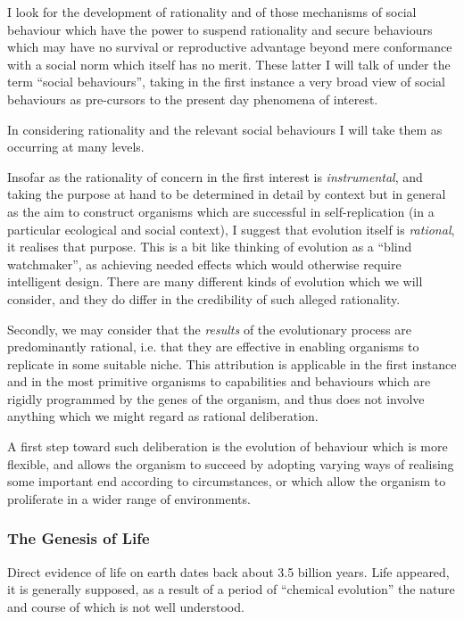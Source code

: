 \documentclass[10pt,titlepage]{book}
\begin{document}
I look for the development of rationality and of those mechanisms of social behaviour which have the power to suspend rationality and secure behaviours which may have no survival or reproductive advantage beyond mere conformance with a social norm which itself has no merit.
These latter I will talk of under the term ``social behaviours'', taking in the first instance a very broad view of social behaviours as pre-cursors to the present day phenomena of interest.

In considering rationality and the relevant social behaviours I will take them as occurring at many levels.

Insofar as the rationality of concern in the first interest is \emph{instrumental}, and taking the purpose at hand to be determined in detail by context but in general as the aim to construct organisms which are successful in self-replication (in a particular ecological and social context), I suggest that evolution itself is \emph{rational}, it realises that purpose.
This is a bit like thinking of evolution as a ``blind watchmaker'', as achieving needed effects which would otherwise require intelligent design.
There are many different kinds of evolution which we will consider, and they do differ in the credibility of such alleged rationality.

Secondly, we may consider that the \emph{results} of the evolutionary process are predominantly rational, i.e. that they are effective in enabling organisms to replicate in some suitable niche.
This attribution is applicable in the first instance and in the most primitive organisms to capabilities and behaviours which are rigidly programmed by the genes of the organism, and thus does not involve anything which we might regard as rational deliberation.

A first step toward such deliberation is the evolution of behaviour which is more flexible, and allows the organism to succeed by adopting varying ways of realising some important end according to circumstances, or which allow the organism to proliferate in a wider range of environments.

\subsubsection{The Genesis of Life}

Direct evidence of life on earth dates back about 3.5 billion years.
Life appeared, it is generally supposed, as a result of a period of ``chemical evolution'' the nature and course of which is not well understood.
\end{document}
